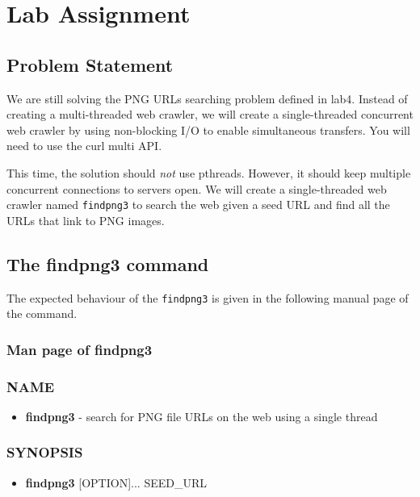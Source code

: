 \section{Lab Assignment}
\subsection{Problem Statement}
We are still solving the PNG URLs searching problem defined in lab4. Instead of creating a multi-threaded web crawler, we will create a single-threaded concurrent web crawler by using non-blocking I/O to enable simultaneous transfers. You will need to use the curl multi API.

This time, the solution should {\em not} use pthreads. However, it should keep multiple concurrent connections to servers open. We will create a single-threaded web crawler named \verb+findpng3+ to search the web given a seed URL and find all the URLs that link to PNG images.

\subsection{The findpng3 command}
The expected behaviour of the \verb+findpng3+ is given in the following manual page of the command.
\subsubsection{Man page of findpng3}
\label{sec:findpng3_manpage}
\subsubsection*{NAME}
\begin{itemize}
	\item[]{\bf findpng3} - search for PNG file URLs on the web using a single thread
\end{itemize}
\subsubsection*{SYNOPSIS}
\begin{itemize}
	\item[]{\bf findpng3} [OPTION]... SEED\_URL
\end{itemize}
